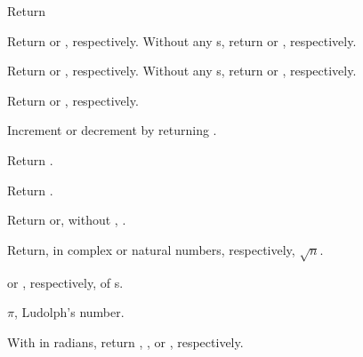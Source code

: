 \begin{LIST}{1cm}

  {
  Return 
  }

  {
  Return  or , respectively. Without any
  s, return  or , respectively.
  }

  {
  Return  or , respectively. Without any
  s, return  or , respectively.
  }

  {Return  or
  , respectively.
  }

  {
  Increment or
  decrement  by  returning .
  }

  {Return .
    }

  {Return .
    }

  {
  Return  or,
  without , .
  }

  {
  Return, in complex or natural numbers, respectively, $\sqrt{n}$.
  }

  {
   or , respectively, of s. 
  }

  {
  $\pi$, Ludolph's number.
  }

  {
  With  in radians, return , , or , respectively.
  }


\end{LIST}
